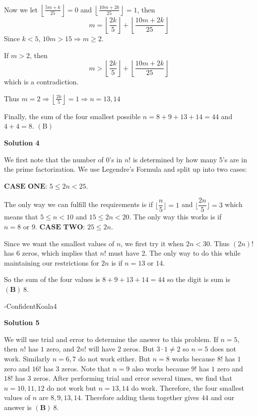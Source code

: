 \begin{enumerate}
 Now we let $\left\lfloor\frac{5m+k}{25}\right\rfloor=0$ and $\left\lfloor\frac{10m+2k}{25}\right\rfloor=1$, then
 \[m=\left\lfloor\frac{2k}{5}\right\rfloor+\left\lfloor\frac{10m+2k}{25}\right\rfloor\]Since $k<5$, $10m>15\Longrightarrow m\ge2$.

 If $m>2$, then
 \[m>\left\lfloor\frac{2k}{5}\right\rfloor+\left\lfloor\frac{10m+2k}{25}\right\rfloor\]which is a contradiction.

 Thus $m=2\Longrightarrow\left\lfloor\frac{2k}{5}\right\rfloor=1\Longrightarrow n=13,14$

 Finally, the sum of the four smallest possible $n=8+9+13+14=44$ and $4+4=8$. $\boxed{\mathrm{(B)}}$




\textbf{Solution 4}

We first note that the number of 0's in $n!$ is determined by how many 5's are in the prime factorization. We use Legendre's Formula and split up into two cases:

 $\textbf{CASE ONE: } 5\leq 2n < 25.$

 The only way we can fulfill the requirements is if $\lfloor{\dfrac{n}{5}}\rfloor = 1$ and $\lfloor{\dfrac{2n}{5}}\rfloor=3$ which means that $5\leq n <10$ and $15\leq 2n < 20$. The only way this works is if $n = 8 \text{ or } 9.$
$\textbf{CASE TWO: } 25 \leq 2n$.

 Since we want the smallest values of $n$, we first try it when $2n<30.$ Thus $(2n)!$ has 6 zeros, which implies that $n!$ must have 2. The only way to do this while maintaining our restrictions for $2n$ is if $n = 13 \text{ or } 14.$

 So the sum of the four values is $8+9+13+14=44$ so the digit is sum is $\boxed{\mathbf{(B)\ }8}.$

 -ConfidentKoala4

 


 



\textbf{Solution 5}

We will use trial and error to determine the answer to this problem. If $n = 5$, then $n!$ has  $1$ zero, and $2n!$ will have $2$ zeros. But $3 \cdot 1 \neq 2$ so $n = 5$ does not work. Similarly $n = 6, 7$ do not work either. But $n = 8$ works because $8!$ has $1$ zero and $16!$ has $3$ zeros. Note that $n = 9$ also works because $9!$ has $1$ zero and $18!$ has $3$ zeros. After performing trial and error several times, we find that $n = 10, 11, 12$ do not work but $n = 13, 14$ do work. Therefore, the four smallest values of $n$ are $8, 9, 13, 14$. Therefore adding them together gives $44$ and our answer is $\boxed{\mathbf{(B)\ }8}.$


\end{enumerate}
